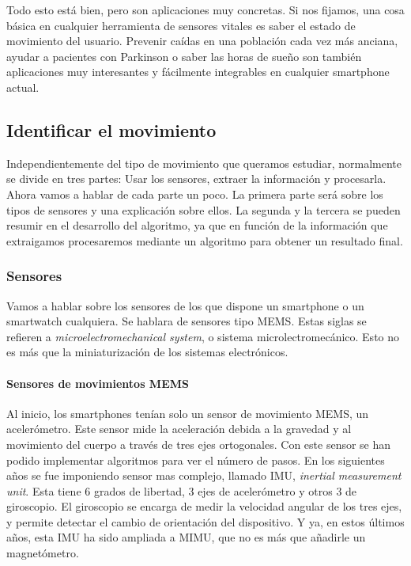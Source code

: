 \documentclass[12pt]{article}
\numberwithin{equation}{section}
\begin{document}
Todo esto está bien, pero son aplicaciones muy concretas. Si nos fijamos, una cosa básica en cualquier herramienta de sensores vitales es saber el estado de movimiento del usuario. Prevenir caídas en una población cada vez más anciana, ayudar a pacientes con Parkinson o saber las horas de sueño son también aplicaciones muy interesantes y fácilmente integrables en cualquier smartphone actual.
\newpage
\subsection{Identificar el movimiento}
Independientemente del tipo de movimiento que queramos estudiar, normalmente se divide en tres partes: Usar los sensores, extraer la información y procesarla. Ahora vamos a hablar de cada parte un poco. La primera parte será sobre los tipos de sensores y una explicación sobre ellos. La segunda y la tercera se pueden resumir en el desarrollo del algoritmo, ya que en función de la información que extraigamos procesaremos mediante un algoritmo para obtener un resultado  final.

\subsubsection{Sensores}
Vamos a hablar sobre los sensores de los que dispone un smartphone o un smartwatch cualquiera. Se hablara de sensores tipo MEMS. Estas siglas se refieren a \textit{microelectromechanical system}, o sistema microlectromecánico. Esto no es más que la miniaturización de los sistemas electrónicos.

\paragraph{Sensores de movimientos MEMS}

Al inicio, los smartphones tenían solo un sensor de movimiento MEMS, un acelerómetro. Este sensor mide la aceleración debida a la gravedad y al movimiento del cuerpo a través de tres ejes ortogonales. Con este sensor se han podido implementar algoritmos para ver el número de pasos. En los siguientes años se fue imponiendo sensor mas complejo, llamado IMU, \textit{inertial measurement unit}. Esta tiene 6 grados de libertad, 3 ejes de acelerómetro y otros 3 de giroscopio. El giroscopio se encarga de medir la velocidad angular de los tres ejes, y permite detectar el cambio de orientación del dispositivo. Y ya, en estos últimos años, esta IMU ha sido ampliada a MIMU, que no es más que añadirle un magnetómetro.
\end{document}
